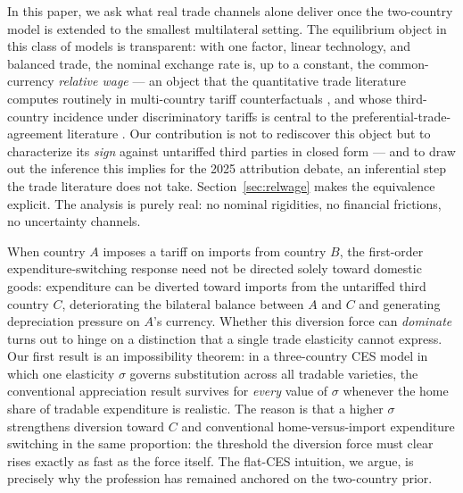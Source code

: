 \documentclass[11pt]{article}
\theoremstyle{plain}
\theoremstyle{remark}
\numberwithin{lemma}{section}
\numberwithin{proposition}{section}
\numberwithin{corollary}{section}
\newenvironment{revblock}{\par\begingroup\color{RevBlue}}{\endgroup\par}
\begin{document}
\begin{revblock}
In this paper, we ask what real trade channels alone deliver once the two-country model is extended to the smallest multilateral setting. The equilibrium object in this class of models is transparent: with one factor, linear technology, and balanced trade, the nominal exchange rate is, up to a constant, the common-currency \emph{relative wage} --- an object that the quantitative trade literature computes routinely in multi-country tariff counterfactuals \citep{caliendo2015, ossa2014, costinot2014}, and whose third-country incidence under discriminatory tariffs is central to the preferential-trade-agreement literature \citep{bagwell1999, bond1996, ornelas2005}. Our contribution is not to rediscover this object but to characterize its \emph{sign} against untariffed third parties in closed form --- and to draw out the inference this implies for the 2025 attribution debate, an inferential step the trade literature does not take. Section~\ref{sec:relwage} makes the equivalence explicit. The analysis is purely real: no nominal rigidities, no financial frictions, no uncertainty channels.

When country $A$ imposes a tariff on imports from country $B$, the first-order expenditure-switching response need not be directed solely toward domestic goods: expenditure can be diverted toward imports from the untariffed third country $C$, deteriorating the bilateral balance between $A$ and $C$ and generating depreciation pressure on $A$'s currency. Whether this diversion force can \emph{dominate} turns out to hinge on a distinction that a single trade elasticity cannot express. Our first result is an impossibility theorem: in a three-country CES model in which one elasticity $\sigma$ governs substitution across all tradable varieties, the conventional appreciation result survives for \emph{every} value of $\sigma$ whenever the home share of tradable expenditure is realistic. The reason is that a higher $\sigma$ strengthens diversion toward $C$ and conventional home-versus-import expenditure switching in the same proportion: the threshold the diversion force must clear rises exactly as fast as the force itself. The flat-CES intuition, we argue, is precisely why the profession has remained anchored on the two-country prior.


\end{revblock}
\end{document}

